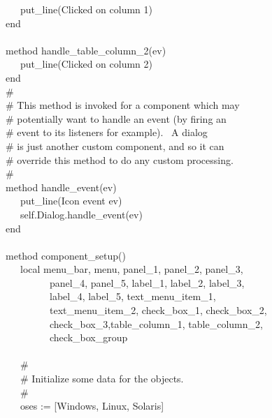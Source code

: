 {\>   \ \ \ put\_line({\textquotedbl}Clicked on column
1{\textquotedbl}) \\
\>   end \\
\ \\
\>   method handle\_table\_column\_2(ev) \\
\>   \ \ \ put\_line({\textquotedbl}Clicked on column
2{\textquotedbl}) \\
\>   end
\ \\
\>   \# \\
\>   \# This method is invoked for a component which may  \\
\>   \# potentially want to handle an event (by firing an \\
\>   \# event to its listeners for example). \ A dialog \\
\>   \# is just another custom component, and so it can \\
\>   \# override this method to do any custom processing. \\
\>   \# \\
\>   method handle\_event(ev) \\
\>   \ \ \ put\_line({\textquotedbl}Icon event {\textquotedbl}
{\textbar}{\textbar} ev) \\
\>   \ \ \ self.Dialog.handle\_event(ev) \\
\>   end \\
\ \\
\>   method component\_setup() \\
\>   \ \ \ local menu\_bar, menu, panel\_1, panel\_2, panel\_3,  \\
\>   \ \ \ \ \ \ \ \ \ panel\_4, panel\_5, label\_1, label\_2,
label\_3,  \\
\>   \ \ \ \ \ \ \ \ \ label\_4, label\_5, text\_menu\_item\_1,  \\
\>   \ \ \ \ \ \ \ \ \ text\_menu\_item\_2, check\_box\_1,
check\_box\_2, \\
\>   \ \ \ \ \ \ \ \ \ check\_box\_3,table\_column\_1,
table\_column\_2, \\
\>   \ \ \ \ \ \ \ \ \ check\_box\_group \\
\ \\
\>   \ \ \ \# \\
\>   \ \ \ \# Initialize some data for the objects. \\
\>   \ \ \ \# \\
\>   \ \ \ oses := [{\textquotedbl}Windows{\textquotedbl},
{\textquotedbl}Linux{\textquotedbl},
{\textquotedbl}Solaris{\textquotedbl}] \\
}

